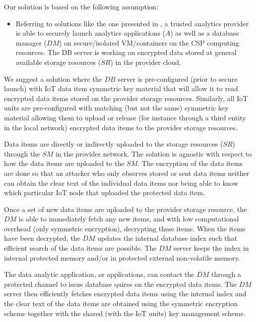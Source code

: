 {Our solution is based on the following assumption:
\begin{itemize}
\item Referring to solutions like the one presented in \cite{Schuster2015} \cite{Paladi2017}, a trusted analytics provider is able to securely launch analytics applications ($A$) as well as a database manager ($DM$) on secure/isolated VM/containers on the CSP computing resources. The DB server is working on encrypted data stored at general available storage resources ($SR$) in the provider cloud. 
\end {itemize}
We suggest a solution where the $DB$ server is pre-configured (prior to secure \\ launch) with IoT data item symmetric key material that will allow it to read encrypted data items stored on the provider storage resources. Similarly, all IoT units are pre-configured with matching (but not the same) symmetric key material allowing them to upload or release (for instance through a third entity in the local network) encrypted data items to the provider storage resources.

Data items are directly or indirectly uploaded to the storage resources ($SR$) through the $SM$ in the provider network. The solution is agnostic with respect to how the data items are uploaded to the $SM$. The encryption of the data items are done so that an attacker who only observes stored or sent data items neither can obtain the clear text of the individual data items nor being able to know which particular IoT node that uploaded the protected data item. 
 
Once a set of new data items are uploaded to the provider storage resource, the $DM$ is able to immediately fetch any new items, and with low computational overhead (only symmetric encryption), decrypting these items. When the items have been decrypted, the $DM$ updates the internal database index such that efficient search of the data items are possible. The $DM$ server keeps the index in internal protected memory and/or in protected external non-volatile memory.

The data analytic application, or applications, can contact the $DM$ through a protected channel to issue database quires on the encrypted data items. The $DM$ server then efficiently fetches encrypted data items using the internal index and the clear text of the data items are obtained using the symmetric encryption scheme together with the shared (with the IoT units) key management scheme.

}
